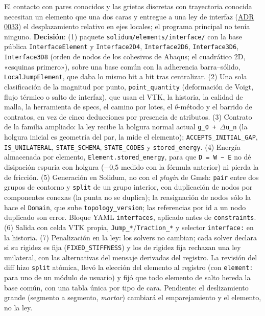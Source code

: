 \documentclass[11pt,oneside]{report}
\begin{document}
El contacto con pares conocidos y las grietas discretas con trayectoria conocida necesitan un elemento que una dos caras y entregue a una ley de interfaz (\hyperref[adr:0033]{ADR 0033}) el desplazamiento relativo en ejes locales; el programa principal no tenía ninguno. \textbf{Decisión}: (1) paquete \texttt{solidum/\allowbreak{}elements/\allowbreak{}interface/\allowbreak{}} con la base pública \texttt{InterfaceElement} y \texttt{Interface2D4}, \texttt{Interface2D6}, \texttt{Interface3D6}, \texttt{Interface3D8} (orden de nodos de los cohesivos de Abaqus; el cuadrático 2D, «esquinas primero»), sobre una base común con la adherencia barra--sólido, \texttt{LocalJumpElement}, que daba lo mismo bit a bit tras centralizar. (2) Una sola clasificación de la magnitud por punto, \texttt{point\_quantity} (deformación de Voigt, flujo térmico o salto de interfaz), que usan el VTK, la historia, la calidad de malla, la herramienta de specs, el camino por lotes, el \ensuremath{\theta}-método y el barrido de contratos, en vez de cinco deducciones por presencia de atributos. (3) Contrato de la familia ampliado: la ley recibe la holgura normal actual \texttt{g\_0 + \ensuremath{\Delta}u\_n} (la holgura inicial es geometría del par, la mide el elemento); \texttt{ACCEPTS\_\allowbreak{}INITIAL\_\allowbreak{}GAP}, \texttt{IS\_UNILATERAL}, \texttt{STATE\_SCHEMA}, \texttt{STATE\_CODES} y \texttt{stored\_energy}. (4) Energía almacenada por elemento, \texttt{Element.\allowbreak{}stored\_\allowbreak{}energy}, para que \texttt{D = W − E} no dé disipación espuria con holgura (−0,5 medido con la fórmula anterior) ni pierda la de fricción. (5) Generación en Solidum, no con el \textit{plugin} de Gmsh: \texttt{pair} entre dos grupos de contorno y \texttt{split} de un grupo interior, con duplicación de nodos por componentes conexas (la punta no se duplica); la reasignación de nodos sólo la hace el \texttt{Domain}, que sube \texttt{topology\_version}; las referencias por id a un nodo duplicado son error. Bloque YAML \texttt{interfaces}, aplicado antes de \texttt{constraints}. (6) Salida con celda VTK propia, \texttt{Jump\_*}/\texttt{Traction\_*} y selector \texttt{interface:} en la historia. (7) Penalización en la ley: los solvers no cambian; cada solver declara si su rigidez es fija (\texttt{FIXED\_STIFFNESS}) y los de rigidez fija rechazan una ley unilateral, con las alternativas del mensaje derivadas del registro. La revisión del diff hizo \texttt{split} atómica, llevó la elección del elemento al registro (con \texttt{element:} para uno de un módulo de usuario) y fijó que todo elemento de salto hereda la base común, con una tabla única por tipo de cara. Pendiente: el deslizamiento grande (segmento a segmento, \textit{mortar}) cambiará el emparejamiento y el elemento, no la ley.
\end{document}
